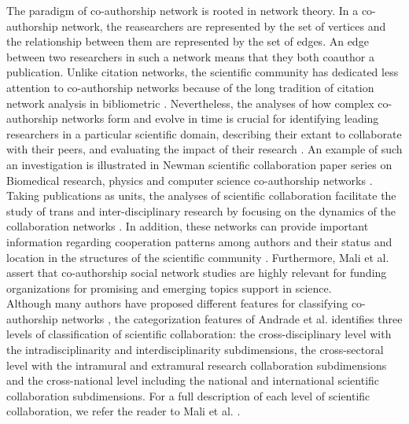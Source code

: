 The paradigm of co-authorship network is rooted in network theory. In a co-authorship network, the reasearchers are represented by the set of vertices and the relationship between them are represented by the set of edges. An edge between two researchers in such a network means that they both coauthor a publication. Unlike citation networks, the scientific community has dedicated less attention to co-authorship networks because of the long tradition of citation network analysis in bibliometric \cite{newman_structure_2001,newman_coauthorship_2004}. Nevertheless, the analyses of how complex co-authorship networks form and evolve in time is crucial for identifying leading researchers in a particular scientific domain, describing their extant to collaborate with their peers, and evaluating the impact of their research \cite{gonzalez-alcaide_scientific_2012}. An example of such an investigation is illustrated in Newman scientific collaboration paper series on Biomedical research, physics and computer science co-authorship networks \cite{newman_structure_2001,newman_coauthorship_2004,newman_scientific_2001,newman_scientific_2001-1}.\\
Taking publications as units, the analyses of scientific collaboration facilitate the study of trans and inter-disciplinary research by focusing on the dynamics of the collaboration networks \cite{borner_visualizing_2003}.  In addition, these networks can provide important information regarding cooperation patterns among authors and their status and location in the structures of the scientific community \cite{scharnhorst_models_2012}. Furthermore, Mali et al. \cite{mali_dynamic_2012} assert that co-authorship social network studies are highly relevant for funding organizations for promising and emerging topics support in science.\\
Although many authors have proposed different features for classifying co-authorship networks \cite{andrade_dimensions_2009,rogers_obstacles_2001,sonnenwald_scientific_2007}, the categorization features of Andrade et al. \cite{andrade_dimensions_2009} identifies three levels of classification of scientific collaboration: the cross-disciplinary level with the intradisciplinarity and interdisciplinarity subdimensions, the cross-sectoral level with the intramural and extramural research collaboration subdimensions and the cross-national level including the national and international scientific collaboration subdimensions. For a full description of each level of scientific collaboration, we refer the reader to Mali et al. \cite{mali_dynamic_2012}. \\%
